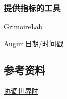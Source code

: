 \hypertarget{ux63d0ux4f9bux6307ux6807ux7684ux5de5ux5177}{%
\subsubsection{提供指标的工具}\label{ux63d0ux4f9bux6307ux6807ux7684ux5de5ux5177}}

\href{https://chaoss.github.io/grimoirelab/}{GrimoireLab}

\href{https://docs.augur.net/\#dates-timestamps}{Augur 日期/时间戳}

\hypertarget{ux53c2ux8003ux8d44ux6599}{%
\subsection{参考资料}\label{ux53c2ux8003ux8d44ux6599}}

\href{https://en.wikipedia.org/wiki/Coordinated_Universal_Time}{协调世界时}
